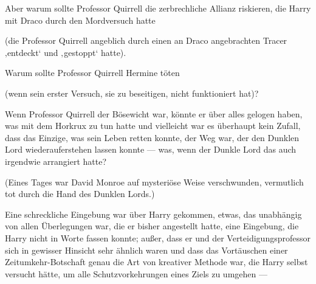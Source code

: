 Aber warum sollte Professor Quirrell die zerbrechliche Allianz riskieren, die Harry mit Draco durch den Mordversuch hatte

(die Professor Quirrell angeblich durch einen an Draco angebrachten Tracer ‚entdeckt‘ und ‚gestoppt‘ hatte).

Warum sollte Professor Quirrell Hermine töten

(wenn sein erster Versuch, sie zu beseitigen, nicht funktioniert hat)?

Wenn Professor Quirrell der Bösewicht war, könnte er über alles gelogen haben, was mit dem Horkrux zu tun hatte und vielleicht war es überhaupt kein Zufall, dass das Einzige, was sein Leben retten konnte, der Weg war, der den Dunklen Lord wiederauferstehen lassen konnte — was, wenn der Dunkle Lord das auch irgendwie arrangiert hatte?

(Eines Tages war David Monroe auf mysteriöse Weise verschwunden, vermutlich tot durch die Hand des Dunklen Lords.)

Eine schreckliche Eingebung war über Harry gekommen, etwas, das unabhängig von allen Überlegungen war, die er bisher angestellt hatte, eine Eingebung, die Harry nicht in Worte fassen konnte; außer, dass er und der Verteidigungsprofessor sich in gewisser Hinsicht sehr ähnlich waren und dass das Vortäuschen einer Zeitumkehr-Botschaft genau die Art von kreativer Methode war, die Harry selbst versucht hätte, um alle Schutzvorkehrungen eines Ziels zu umgehen —

